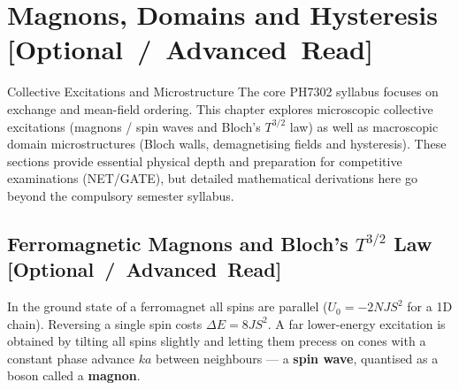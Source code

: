 \documentclass[11pt,a4paper]{article}
\newcommand{\extratag}{\hfill\mbox{\normalfont\footnotesize\sffamily\color{secondary}\textbf{[Optional / Advanced Read]}}}
\begin{document}
\section[Magnons, Domains and Hysteresis (Optional Extension)]{Magnons, Domains and Hysteresis \extratag}
\label{ch:magnons}

\begin{enrichmentnote}{Collective Excitations and Microstructure}
The core PH7302 syllabus focuses on exchange and mean-field ordering. This chapter explores microscopic collective excitations (magnons / spin waves and Bloch's $T^{3/2}$ law) as well as macroscopic domain microstructures (Bloch walls, demagnetising fields and hysteresis). These sections provide essential physical depth and preparation for competitive examinations (NET/GATE), but detailed mathematical derivations here go beyond the compulsory semester syllabus.
\end{enrichmentnote}

\subsection[Ferromagnetic Magnons and Bloch T3/2 Law (Optional Read)]{Ferromagnetic Magnons and Bloch's \texorpdfstring{$T^{3/2}$}{T3/2} Law \extratag}

In the ground state of a ferromagnet all spins are parallel ($U_0 = -2NJS^2$ for a 1D chain). Reversing a single spin costs $\Delta E = 8JS^2$. A far lower-energy excitation is obtained by tilting all spins slightly and letting them precess on cones with a constant phase advance $ka$ between neighbours --- a \textbf{spin wave}, quantised as a boson called a \textbf{magnon}.
\end{document}
